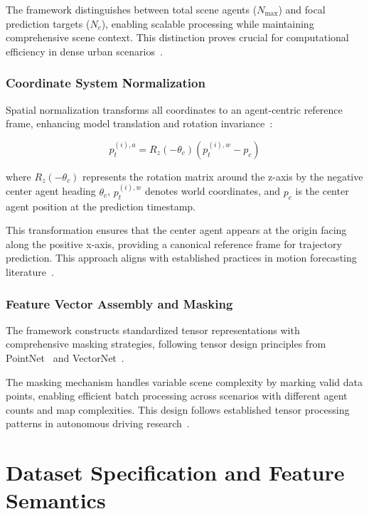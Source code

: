 The framework distinguishes between total scene agents ($N_{\max}$) and focal prediction targets ($N_{c}$), enabling scalable processing while maintaining comprehensive scene context. This distinction proves crucial for computational efficiency in dense urban scenarios~\cite{hu2023planning}.

\subsubsection{Coordinate System Normalization}
\label{ssec:coordinate_normalization}

Spatial normalization transforms all coordinates to an agent-centric reference frame, enhancing model translation and rotation invariance~\cite{qcnetZhou2023, gao2020vectornet}:

\begin{equation}
p_{t}^{(i),a} = R_{z}(-\theta_{c})(p_{t}^{(i),w} - p_{c})
\end{equation}

where $R_{z}(-\theta_{c})$ represents the rotation matrix around the z-axis by the negative center agent heading $\theta_{c}$, $p_{t}^{(i),w}$ denotes world coordinates, and $p_{c}$ is the center agent position at the prediction timestamp.

This transformation ensures that the center agent appears at the origin facing along the positive x-axis, providing a canonical reference frame for trajectory prediction. This approach aligns with established practices in motion forecasting literature~\cite{shi2022motion, DenseTNT2021}.

\subsubsection{Feature Vector Assembly and Masking}
\label{ssec:feature_assembly}

The framework constructs standardized tensor representations with comprehensive masking strategies, following tensor design principles from PointNet~\cite{PointNet2017} and VectorNet~\cite{VectorNet2020}.

The masking mechanism handles variable scene complexity by marking valid data points, enabling efficient batch processing across scenarios with different agent counts and map complexities. This design follows established tensor processing patterns in autonomous driving research~\cite{SceneTransformer2022}.

\section{Dataset Specification and Feature Semantics}
\label{sec:data_datasetitem}

